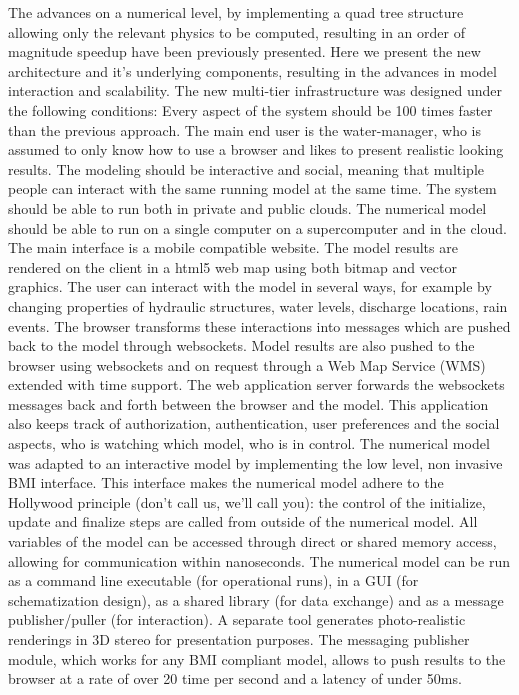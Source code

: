 \documentclass[a4paper]{article}
\begin{document}
The advances on a numerical level, by implementing a quad tree structure allowing only the relevant physics to be computed, resulting in an order of magnitude speedup have been previously presented. Here we present the new architecture and it's underlying components, resulting in the advances in model interaction and scalability.
The new multi-tier infrastructure was designed under the following conditions:
Every aspect of the system should be 100 times faster than the previous approach.
The main end user is the water-manager, who is assumed to only know how to use a browser and likes to present realistic looking results.
The modeling should be interactive and social, meaning that multiple people can interact with the same running model at the same time.
The system should be able to run both in private and public clouds. The numerical model should be able to run on a single computer on a supercomputer and in the cloud.
The main interface is a mobile compatible website. The model results are rendered on the client in a html5 web map using both bitmap and vector graphics. The user can interact with the model in several ways, for example by changing properties of hydraulic structures, water levels, discharge locations, rain events. The browser transforms these interactions into messages which are pushed back to the model through websockets. Model results are also pushed to the browser using websockets and on request through a Web Map Service (WMS) extended with time support.
The web application server forwards the websockets messages back and forth between the browser and the model. This application also keeps track of authorization, authentication, user preferences and the social aspects, who is watching which model, who is in control.
The numerical model was adapted to an interactive model by implementing the low level, non invasive BMI interface. This interface makes the numerical model adhere to the Hollywood principle (don't call us, we'll call you): the control of the initialize, update and finalize steps are called from outside of the numerical model. All variables of the model can be accessed through direct or shared memory access, allowing for communication within nanoseconds. The numerical model can be run as a command line executable (for operational runs), in a GUI (for schematization design), as a shared library (for data exchange) and as a message publisher/puller (for interaction). A separate tool generates photo-realistic renderings in 3D stereo for presentation purposes. The messaging publisher module, which works for any BMI compliant model, allows to push results to the browser at a rate of over 20 time per second and a latency of under 50ms.
\end{document}
